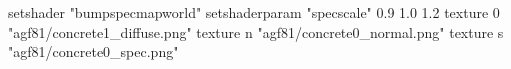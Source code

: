setshader "bumpspecmapworld"
setshaderparam "specscale" 0.9 1.0 1.2
    texture 0 "agf81/concrete1_diffuse.png"
    texture n "agf81/concrete0_normal.png"
    texture s "agf81/concrete0_spec.png"